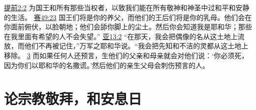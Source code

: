 \documentclass[12pt, a4paper, oneside]{ctexart}
\begin{document}
{		\href{https://biblehub.com/1_timothy/2-2.htm}{提前2:2} 为国王和所有那些当权者，以致我们能在所有敬神和神圣中过和平和安静的生活。
		\href{https://biblehub.com/isaiah/49-23.htm}{赛49:23} 国王们将是你的养父，而他们的王后们将是你的乳母。他们会在你面前俯伏，以脸朝地；他们会舔你脚上的尘土。然后你会知道我是耶和华；那些在我里面有希望的人不会失望。”
		\href{https://biblehub.com/zechariah/13-2.htm}{亚13:2} “在那天，我会把偶像的名从这土地上流放，而他们不再被记住，”万军之耶和华说。“我会把先知和不洁的灵都从这土地上移除。
		\href{https://biblehub.com/zechariah/13-3.htm}{3} 而如果任何人还预言，生他们的父亲和母亲就会对他们说：‘你必须死，因为你们以耶和华的名撒谎。’然后他们的亲生父母会刺伤预言的人。
	}

\section{论宗教敬拜，和安息日}
\end{document}
